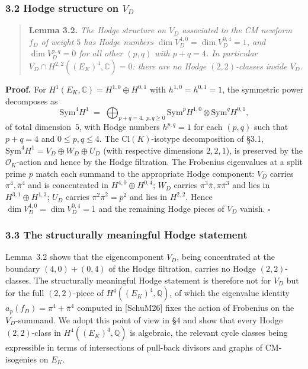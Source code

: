 \documentclass[
  11pt,
  a4paper,
]{amsart}
\begin{document}
\hypertarget{hodge-structure-on-v_d}{%
\subsubsection{\texorpdfstring{3.2 Hodge structure on \(V_D\)}{3.2 Hodge structure on V\_D}}\label{hodge-structure-on-v_d}}

\begin{quote}
\textbf{Lemma 3.2.} \emph{The Hodge structure on \(V_D\) associated to the CM newform \(f_D\) of weight \(5\) has Hodge numbers \(\dim V_D^{4,0} = \dim V_D^{0,4} = 1\), and \(\dim V_D^{p,q} = 0\) for all other \((p,q)\) with \(p + q = 4\). In particular \(V_D \cap H^{2,2}((E_K)^4, \mathbb{C}) = 0\): there are no Hodge \((2,2)\)-classes inside \(V_D\).}
\end{quote}

\textbf{Proof.} For \(H^1(E_K, \mathbb{C}) = H^{1,0} \oplus H^{0,1}\) with \(h^{1,0} = h^{0,1} = 1\), the symmetric power decomposes as
\[
\mathrm{Sym}^4 H^1 \;=\; \bigoplus_{p+q=4,\; p,q\geq 0} \mathrm{Sym}^p H^{1,0} \otimes \mathrm{Sym}^q H^{0,1},
\]
of total dimension~\(5\), with Hodge numbers \(h^{p, q} = 1\) for each \((p, q)\) such that \(p + q = 4\) and \(0 \le p, q \le 4\). The \(\mathrm{Cl}(K)\)-isotype decomposition of \S3.1, \(\mathrm{Sym}^4 H^1 = V_D \oplus W_D \oplus U_D\) (with respective dimensions \(2, 2, 1\)), is preserved by the \(\mathcal{O}_K\)-action and hence by the Hodge filtration. The Frobenius eigenvalues at a split prime \(p\) match each summand to the appropriate Hodge component: \(V_D\) carries \(\pi^4, \overline{\pi}^4\) and is concentrated in \(H^{4,0} \oplus H^{0,4}\); \(W_D\) carries \(\pi^3 \overline{\pi}, \pi \overline{\pi}^3\) and lies in \(H^{3,1} \oplus H^{1,3}\); \(U_D\) carries \(\pi^2 \overline{\pi}^2 = p^2\) and lies in \(H^{2,2}\). Hence \(\dim V_D^{4,0} = \dim V_D^{0,4} = 1\) and the remaining Hodge pieces of \(V_D\) vanish. \(\square\)

\hypertarget{corrected-statement-of-the-main-theorem}{%
\subsubsection{3.3 The structurally meaningful Hodge statement}\label{corrected-statement-of-the-main-theorem}}

Lemma~3.2 shows that the eigencomponent \(V_D\), being concentrated at the boundary \((4,0) + (0,4)\) of the Hodge filtration, carries no Hodge \((2,2)\)-classes. The structurally meaningful Hodge statement is therefore not for \(V_D\) but for the full \((2,2)\)-piece of \(H^4((E_K)^4, \mathbb{Q})\), of which the eigenvalue identity \(a_p(f_D) = \pi^4 + \overline{\pi}^4\) computed in [SchuM26] fixes the action of Frobenius on the \(V_D\)-summand. We adopt this point of view in \S4 and show that every Hodge \((2,2)\)-class in \(H^4((E_K)^4, \mathbb{Q})\) is algebraic, the relevant cycle classes being expressible in terms of intersections of pull-back divisors and graphs of CM-isogenies on \(E_K\).
\end{document}
